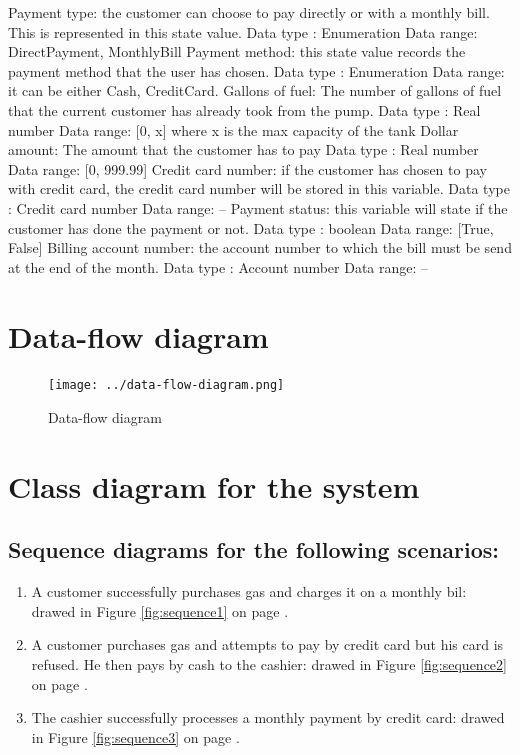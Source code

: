 \documentclass[11pt,a4paper]{article}
\begin{document}
\begin{outline}
	\1 Payment type: the customer can choose to pay directly or with a monthly bill. This is represented in this state value.
		\2 Data type : Enumeration
		\2 Data range: DirectPayment, MonthlyBill
	\1 Payment method: this state value records the payment method that the user has chosen.
		\2 Data type : Enumeration
		\2 Data range: it can be either Cash, CreditCard.
	\1 Gallons of fuel: The number of gallons of fuel that the current customer has already took from the pump.
		\2 Data type : Real number
		\2 Data range: [0, x] where x is the max capacity of the tank
	\1 Dollar amount: The amount that the customer has to pay 
		\2 Data type : Real number
		\2 Data range:  [0, 999.99]
	\1 Credit card number: if the customer has chosen to pay with credit card, the credit card number will be stored in this variable.
		\2 Data type : Credit card number
		\2 Data range: --
	\1 Payment status: this variable will state if the customer has done the payment or not.
		\2 Data type : boolean
		\2 Data range: [True, False]
	\1 Billing account number: the account number to which the bill must be send at the end of the month.
		\2 Data type : Account number
		\2 Data range: --
\end{outline}

\section{Data-flow diagram}

\begin{figure}[H]
 \centering
 \texttt{[image: ../data-flow-diagram.png]} 
 \caption{Data-flow diagram}
 \label{fig:dataflow}
\end{figure}


\section{Class diagram for the system}



\subsection*{Sequence diagrams for the following scenarios:}
\begin{enumerate}
	\item A customer successfully purchases gas and charges it on a monthly bil: drawed in Figure \ref{fig:sequence1} on page \pageref{fig:sequence1}.
	\item A customer purchases gas and attempts to pay by credit card but his card is refused. He then pays by cash to the cashier: drawed in Figure \ref{fig:sequence2} on page \pageref{fig:sequence2}.
	\item The cashier successfully processes a monthly payment by credit card: drawed in Figure \ref{fig:sequence3} on page \pageref{fig:sequence3}.
\end{enumerate}
\end{document}
